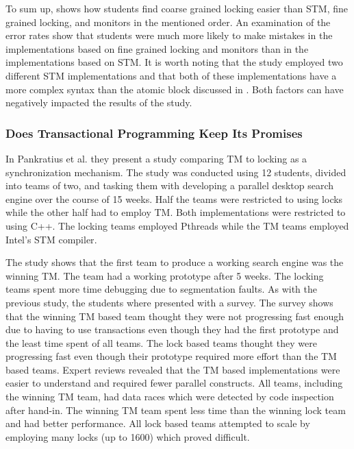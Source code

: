 To sum up, \cite{rossbach2010transactional} shows how students find coarse grained locking easier than \ac{STM}, fine grained locking, and monitors in the mentioned order\cite[p. 54]{rossbach2010transactional}. An examination of the error rates show that students were much more likely to make mistakes in the implementations based on fine grained locking and monitors than in the implementations based on \ac{STM}\cite[p. 54]{rossbach2010transactional}. It is worth noting that the study employed two different \ac{STM} implementations and that both of these implementations have a more complex syntax than the atomic block discussed in \cite[p. 49]{rossbach2010transactional}. Both factors can have negatively impacted the results of the study.

\subsubsection{Does Transactional Programming Keep Its Promises}
\label{sec:stm_ease_pankratius}
In \cite{pankratius2009does} Pankratius et al. they present a study comparing \ac{TM} to locking as a synchronization mechanism. The study was conducted using 12 students, divided into teams of two, and tasking them with developing a parallel desktop search engine over the course of 15 weeks. Half the teams were restricted to using locks while the other half had to employ \ac{TM}. Both implementations were restricted to using C++. The locking teams employed Pthreads\cite[p. 2]{pankratius2009does} while the \ac{TM} teams employed Intel’s STM compiler\cite[p. 3]{pankratius2009does}.

The study shows that the first team to produce a working search engine was the winning \ac{TM}\cite[p. 6]{pankratius2009does}. The team had a working prototype after 5 weeks.   The locking teams spent more time debugging due to segmentation faults\cite[p. 6]{pankratius2009does}. As with the previous study, the students where presented with a survey. The survey shows that the  winning \ac{TM} based team thought they were not progressing fast enough due to having to use transactions even though they had the first prototype and the least time spent of all teams\cite[p. 7]{pankratius2009does}. The lock based teams thought they were progressing fast even though their prototype required more effort than the \ac{TM} based teams\cite[p. 6]{pankratius2009does}. Expert reviews revealed that the \ac{TM} based implementations were easier to understand and required fewer parallel constructs\cite[p. 6]{pankratius2009does}. All teams, including the winning \ac{TM} team, had data races which were detected by code inspection after hand-in\cite[p. 6]{pankratius2009does}. The winning \ac{TM} team spent less time than the winning lock team and had better performance\cite[p. 23]{pankratius2009does}. All lock based teams attempted to scale by employing many locks (up to 1600) which proved difficult\cite[p. 23]{pankratius2009does}.


